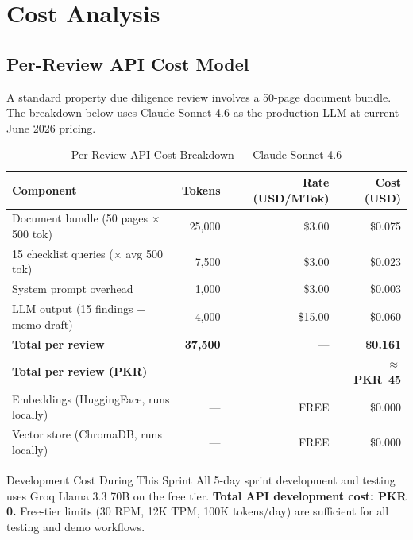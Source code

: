 \documentclass[12pt, a4paper]{article}
\begin{document}
\section{Cost Analysis}

\subsection{Per-Review API Cost Model}

A standard property due diligence review involves a 50-page document bundle.
The breakdown below uses Claude Sonnet 4.6 as the production LLM at current
June 2026 pricing.

\begin{table}[H]
\centering
\caption{Per-Review API Cost Breakdown --- Claude Sonnet 4.6}
\renewcommand{\arraystretch}{1.3}
\begin{tabularx}{\textwidth}{Xrrr}
\toprule
\textbf{Component} & \textbf{Tokens} & \textbf{Rate (USD/MTok)} & \textbf{Cost (USD)} \\
\midrule
Document bundle (50 pages $\times$ 500 tok)   & 25,000 & \$3.00  & \$0.075 \\
15 checklist queries ($\times$ avg 500 tok)   &  7,500 & \$3.00  & \$0.023 \\
System prompt overhead                         &  1,000 & \$3.00  & \$0.003 \\
LLM output (15 findings + memo draft)         &  4,000 & \$15.00 & \$0.060 \\
\midrule
\textbf{Total per review}                     & \textbf{37,500} & --- & \textbf{\$0.161} \\
\textbf{Total per review (PKR)}               &        &     & \textbf{$\approx$ PKR~45} \\
\midrule
Embeddings (HuggingFace, runs locally)        & ---    & FREE    & \$0.000 \\
Vector store (ChromaDB, runs locally)         & ---    & FREE    & \$0.000 \\
\bottomrule
\end{tabularx}
\label{tab:apicost}
\end{table}

\begin{calloutbox}{Development Cost During This Sprint}
All 5-day sprint development and testing uses Groq Llama 3.3 70B on the free
tier. \textbf{Total API development cost: PKR 0.} Free-tier limits (30 RPM,
12K TPM, 100K tokens/day) are sufficient for all testing and demo workflows.
\end{calloutbox}
\end{document}
